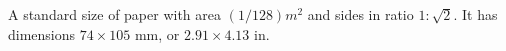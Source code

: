A standard size of paper with area $(1/128)m^{2}$  and sides in ratio
$ 1 : \sqrt{2}$. It has dimensions $ 74 \times 105$ mm, or $2.91 \times 4.13$ in.